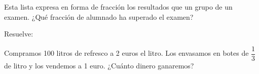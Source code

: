 \documentclass[addpoints,spanish, 12pt,a4paper]{exam}
\begin{document}
\begin{questions}
\question[1] Esta lista expresa en forma de fracción los resultados que un grupo de un examen. ¿Qué fracción de alumnado ha superado el examen?  


\begin{center}
\end{center}
\vspace{40pt}

\question Resuelve:


\question[2] Compramos 100 litros de refresco a 2 euros el litro. Los envasamos en botes de \( \dfrac{1}{3} \) de litro y los vendemos a 1 euro. ¿Cuánto dinero ganaremos?

\end{questions}
\end{document}
